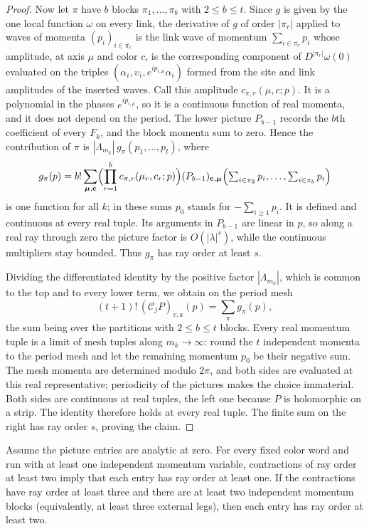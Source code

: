 \begin{proof}
Now let $\pi$ have $b$ blocks $\pi_1,\ldots,\pi_b$ with
$2\leq b\leq t$. Since $g$ is given by the one local function $\omega$
on every link, the derivative of $g$ of order $|\pi_r|$ applied to
waves of momenta $(p_i)_{i\in\pi_r}$ is the link wave of momentum
$\sum_{i\in\pi_r}p_i$ whose amplitude, at axis $\mu$ and color $c$, is
the corresponding component of $D^{|\pi_r|}\omega(0)$ evaluated on the
triples $(\alpha_i,\upsilon_i,e^{ip_{i,\mu}}\alpha_i)$ formed from the
site and link amplitudes of the inserted waves. Call this amplitude
$c_{\pi,r}(\mu,c;p)$. It is a polynomial in the phases
$e^{ip_{i,\mu}}$, so it is a continuous function of real momenta, and
it does not depend on the period. The lower picture $P_{b-1}$ records
the $b$th coefficient of every $F_k$, and the block momenta sum to
zero. Hence the contribution of $\pi$ is
$|\Lambda_{m_k}|\,g_\pi(p_1,\ldots,p_t)$, where
\[
 g_\pi(p)=b!\sum_{\boldsymbol\mu,\mathbf c}
   \Bigl(\prod_{r=1}^{b}c_{\pi,r}(\mu_r,c_r;p)\Bigr)
   (P_{b-1})_{\mathbf c,\boldsymbol\mu}
     \Bigl(\textstyle\sum_{i\in\pi_2}p_i,\ldots,
           \sum_{i\in\pi_b}p_i\Bigr)
\]
is one function for all $k$; in these sums $p_0$ stands for
$-\sum_{i\geq1}p_i$. It is defined and continuous at every real tuple.
Its arguments in $P_{b-1}$ are linear in $p$, so along a real ray
through zero the picture factor is $O(|\lambda|^s)$, while the
continuous multipliers stay bounded. Thus $g_\pi$ has ray order at
least $s$.

Dividing the differentiated identity by the positive factor
$|\Lambda_{m_k}|$, which is common to the top and to every lower
term, we obtain on the period mesh
\[
 (t+1)!\,(\mathcal C_jP)_{v,a}(p)=\sum_{\pi}g_\pi(p),
\]
the sum being over the partitions with $2\leq b\leq t$ blocks.
Every real momentum tuple is a limit of mesh tuples along
$m_k\to\infty$: round the $t$ independent momenta to the period mesh
and let the remaining momentum $p_0$ be their negative sum. The mesh
momenta are determined modulo $2\pi$, and both sides are evaluated at
this real representative; periodicity of the pictures makes the choice
immaterial. Both sides are continuous at real tuples, the left one
because $P$ is holomorphic on a strip. The identity therefore holds at
every real tuple. The finite sum on the right has ray order $s$,
proving the claim.
\end{proof}

\begin{lemma}
\label{lem:ex-ward-rays}
Assume the picture entries are analytic at zero. For every fixed color
word and run with at least one independent momentum variable, contractions
of ray order at least two imply that each entry has ray order at least
one. If the contractions have ray order at least three and there are at
least two independent momentum blocks (equivalently, at least three
external legs), then each entry has ray order at least two.
\end{lemma}

